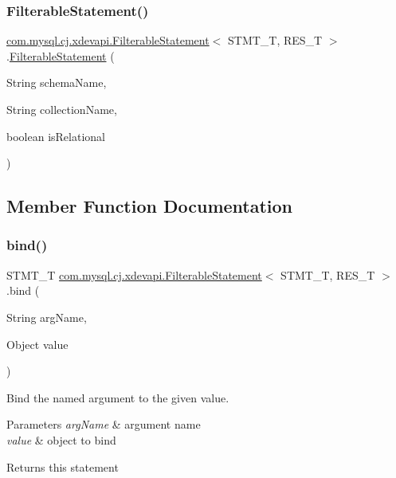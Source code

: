 \subsubsection{\texorpdfstring{Filterable\+Statement()}{FilterableStatement()}\hspace{0.1cm}{\footnotesize\ttfamily [2/2]}}
{\footnotesize\ttfamily \mbox{\hyperlink{classcom_1_1mysql_1_1cj_1_1xdevapi_1_1_filterable_statement}{com.\+mysql.\+cj.\+xdevapi.\+Filterable\+Statement}}$<$ S\+T\+M\+T\+\_\+T, R\+E\+S\+\_\+T $>$.\mbox{\hyperlink{classcom_1_1mysql_1_1cj_1_1xdevapi_1_1_filterable_statement}{Filterable\+Statement}} (\begin{DoxyParamCaption}\item[{String}]{schema\+Name,  }\item[{String}]{collection\+Name,  }\item[{boolean}]{is\+Relational }\end{DoxyParamCaption})}



\subsection{Member Function Documentation}
\mbox{\label{classcom_1_1mysql_1_1cj_1_1xdevapi_1_1_filterable_statement_af9ccf97ebcaf88f6f9317829bf8496cb}} 
\subsubsection{\texorpdfstring{bind()}{bind()}}
{\footnotesize\ttfamily S\+T\+M\+T\+\_\+T \mbox{\hyperlink{classcom_1_1mysql_1_1cj_1_1xdevapi_1_1_filterable_statement}{com.\+mysql.\+cj.\+xdevapi.\+Filterable\+Statement}}$<$ S\+T\+M\+T\+\_\+T, R\+E\+S\+\_\+T $>$.bind (\begin{DoxyParamCaption}\item[{String}]{arg\+Name,  }\item[{Object}]{value }\end{DoxyParamCaption})}

Bind the named argument to the given value.


\begin{DoxyParams}{Parameters}
{\em arg\+Name} & argument name \\
\hline
{\em value} & object to bind \\
\hline
\end{DoxyParams}
\begin{DoxyReturn}{Returns}
this statement 
\end{DoxyReturn}


